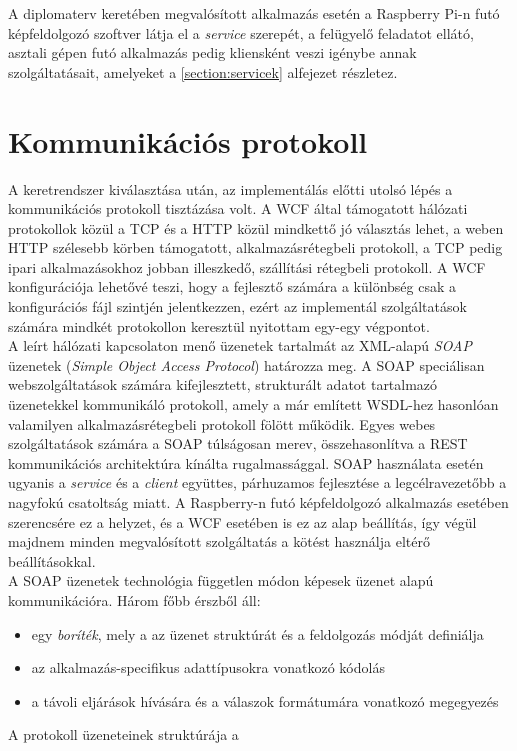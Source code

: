 A diplomaterv keretében megvalósított alkalmazás esetén a Raspberry Pi-n futó képfeldolgozó szoftver látja el a  \emph{service} szerepét, a felügyelő feladatot ellátó, asztali gépen futó alkalmazás pedig kliensként veszi igénybe annak szolgáltatásait, amelyeket a \ref{section:servicek} alfejezet részletez.

\section{Kommunikációs protokoll}

A keretrendszer kiválasztása után, az implementálás előtti utolsó lépés a kommunikációs protokoll tisztázása volt. A WCF által támogatott hálózati protokollok közül a TCP és a HTTP közül mindkettő jó választás lehet, a weben HTTP szélesebb körben támogatott, alkalmazásrétegbeli protokoll, a TCP pedig ipari alkalmazásokhoz jobban illeszkedő, szállítási rétegbeli protokoll. A WCF konfigurációja lehetővé teszi, hogy a fejlesztő számára a különbség csak a konfigurációs fájl szintjén jelentkezzen, ezért az implementál szolgáltatások számára mindkét protokollon keresztül nyitottam egy-egy végpontot.\\
A leírt hálózati kapcsolaton menő üzenetek tartalmát az XML-alapú \emph{SOAP} üzenetek (\emph{Simple Object Access Protocol}) határozza meg. A SOAP speciálisan webszolgáltatások számára kifejlesztett, strukturált adatot tartalmazó üzenetekkel kommunikáló protokoll, amely a már említett WSDL-hez hasonlóan valamilyen alkalmazásrétegbeli protokoll fölött működik. Egyes webes szolgáltatások számára a SOAP túlságosan merev, összehasonlítva a REST kommunikációs architektúra kínálta rugalmassággal. SOAP használata esetén ugyanis a \emph{service} és a \emph{client} együttes, párhuzamos fejlesztése a legcélravezetőbb a nagyfokú csatoltság miatt. A Raspberry-n futó képfeldolgozó alkalmazás esetében szerencsére ez a helyzet, és a WCF esetében is ez az alap beállítás, így végül majdnem minden megvalósított szolgáltatás a  kötést használja eltérő beállításokkal.\\
A SOAP üzenetek technológia független módon képesek üzenet alapú kommunikációra. Három főbb érszből áll:
\begin{itemize}
\item egy \emph{boríték}, mely a az üzenet struktúrát és a feldolgozás módját definiálja
\item az alkalmazás-specifikus adattípusokra vonatkozó kódolás
\item a távoli eljárások hívására és a válaszok formátumára vonatkozó megegyezés
\end{itemize}
A protokoll üzeneteinek struktúrája a 


